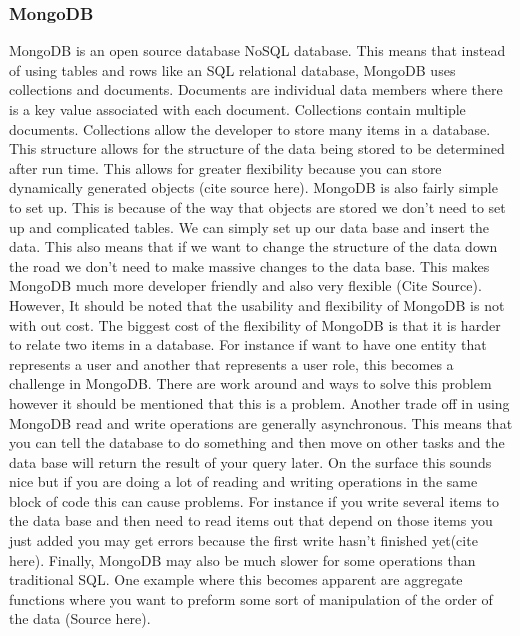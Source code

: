 \documentclass[letterpaper,10pt]{article}
\begin{document}
		\subsubsection{MongoDB}
		MongoDB is an open source database NoSQL database. This means that instead of using tables and rows like an SQL relational database, MongoDB uses collections and documents. Documents are individual data members where there is a key value associated with each document. Collections contain multiple documents. Collections allow the developer to store many items in a database. This structure allows for the structure of the data being stored to be determined after run time. This allows for greater flexibility because you can store dynamically generated objects (cite source here).
		MongoDB is also fairly simple to set up. This is because of the way that objects are stored we don't need to set up and complicated tables. We can simply set up our data base and insert the data. This also means that if we want to change the structure of the data down the road we don't need to make massive changes to the data base. This makes MongoDB much more developer friendly and also very flexible (Cite Source).\\
		However, It should be noted that the usability and flexibility of MongoDB is not with out cost. The biggest cost of the flexibility of MongoDB is that it is harder to relate two items in a database. For instance if want to have one entity that represents a user and another that represents a user role, this becomes a challenge in MongoDB. There are work around and ways to solve this problem however it should be mentioned that this is a problem. Another trade off in using MongoDB read and write operations are generally asynchronous. This means that you can tell the database to do something and then move on other tasks and the data base will return the result of your query later. On the surface this sounds nice but if you are doing a lot of reading and writing operations in the same block of code this can cause problems. For instance if you write several items to the data base and then need to read items out that depend on those items you just added you may get errors because the first write hasn't finished yet(cite here). Finally, MongoDB may also be much slower for some operations than traditional SQL. One example where this becomes apparent are aggregate functions where you want to preform some sort of manipulation of the order of the data (Source here).\\
	
\end{document}
